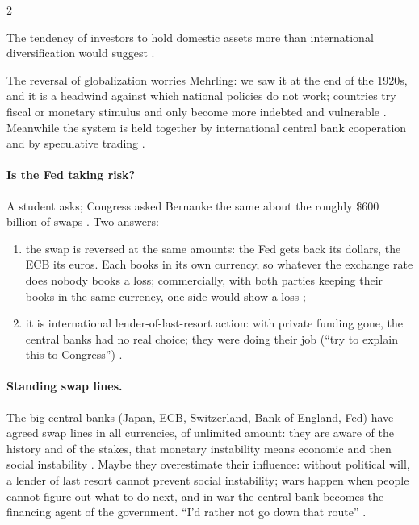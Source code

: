 \begin{paracol}{2}
\begin{definition}
The tendency of investors to hold domestic assets more than international diversification would suggest .
\end{definition}

The reversal of globalization worries Mehrling: we saw it at the end of the 1920s, and it is a headwind against which national policies do not work; countries
try fiscal or monetary stimulus and only become more indebted and vulnerable . Meanwhile the system is held together
by international central bank cooperation and by speculative trading .

\paragraph{Is the Fed taking risk?} A student asks; Congress asked Bernanke the same about the roughly \$600 billion of swaps .
Two answers:
\begin{enumerate}
  \item the swap is reversed at the same amounts: the Fed gets back its dollars, the ECB its euros. Each books in its own currency, so whatever the exchange rate
        does nobody books a loss; commercially, with both parties keeping their books in the same currency, one side would show a loss
        ;
  \item it is international lender-of-last-resort action: with private funding gone, the central banks had no real choice; they were doing their job (``try to
        explain this to Congress'') .
\end{enumerate}

\paragraph{Standing swap lines.} The big central banks (Japan, ECB, Switzerland, Bank of England, Fed) have agreed swap lines in all currencies, of unlimited amount:
they are aware of the history and of the stakes, that monetary instability means economic and then social instability .
Maybe they overestimate their influence: without political will, a lender of last resort cannot prevent social instability; wars happen when people cannot
figure out what to do next, and in war the central bank becomes the financing agent of the government. ``I'd rather not go down that route''
.


\end{paracol}
